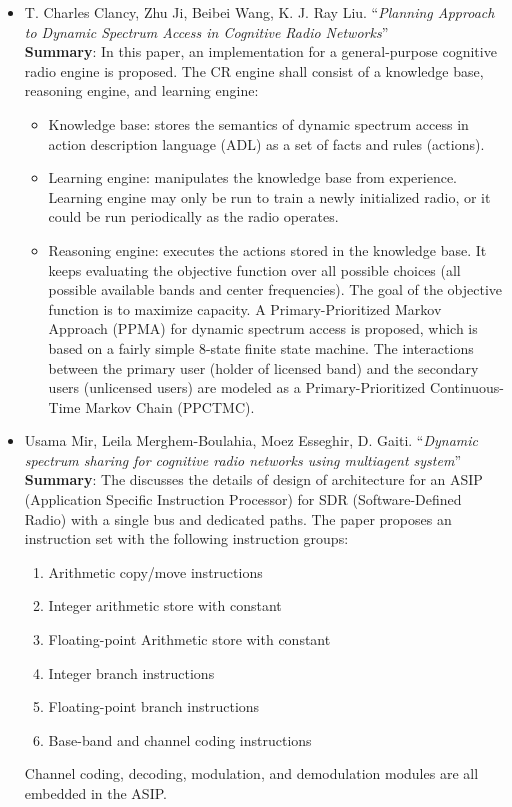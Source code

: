 \documentclass[]{scrartcl}
\begin{document}
\begin {itemize}

\item T. Charles Clancy, Zhu Ji, Beibei Wang, K. J. Ray Liu.
      ``\textit{Planning Approach
      to Dynamic Spectrum Access in Cognitive Radio Networks}''\\
      \textbf{Summary}:
      In this paper, an implementation for a general-purpose cognitive radio
      engine is proposed. The CR engine shall consist of a knowledge base,
      reasoning engine, and learning engine:
      \begin{itemize}
        \item Knowledge base: stores the semantics of dynamic spectrum access
              in action description language (ADL) as a set of facts and rules
              (actions).
        \item Learning engine: manipulates the knowledge base from experience.
              Learning engine may only be run to train a newly initialized
              radio, or it could be run periodically as the radio operates.
        \item Reasoning engine: executes the actions stored in the knowledge
              base. It keeps evaluating the objective function over
              all possible choices (all possible available bands and
              center frequencies). The goal of the objective function
              is to maximize capacity. A Primary-Prioritized Markov
              Approach (PPMA) for dynamic spectrum access is proposed,
              which is based on a fairly simple 8-state finite state machine.
              The interactions between the primary user (holder of licensed
              band) and the secondary users (unlicensed users) are modeled as
              a Primary-Prioritized Continuous-Time Markov Chain (PPCTMC).
      \end{itemize}

\item Usama Mir,
      Leila Merghem-Boulahia,
      Moez Esseghir,
      D. Gaiti.
      ``\textit{Dynamic spectrum sharing for cognitive radio networks
      using multiagent system}''\\
      \textbf{Summary}:
      The discusses the details of design of architecture for an ASIP
      (Application Specific Instruction Processor) for SDR (Software-Defined
      Radio) with a single bus and dedicated paths. The paper proposes
      an instruction set with the following instruction groups:
      \begin{enumerate}
        \item Arithmetic copy/move instructions
        \item Integer arithmetic store with constant
        \item Floating-point Arithmetic store with constant
        \item Integer branch instructions
        \item Floating-point branch instructions
        \item Base-band and channel coding instructions
      \end{enumerate}
      Channel coding, decoding, modulation, and demodulation modules
      are all embedded in the ASIP.


\end{itemize}
\end{document}
